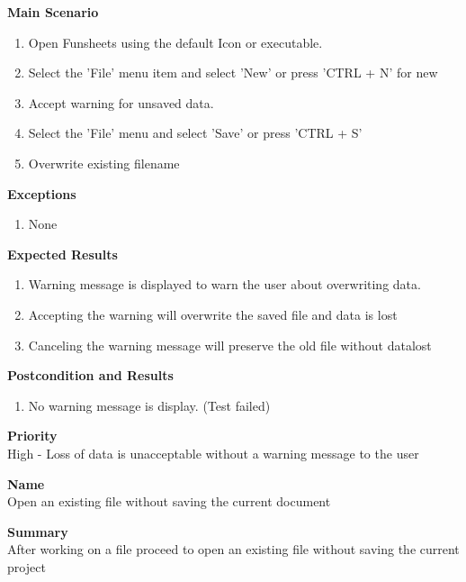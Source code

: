 \documentclass[12pt]{article}
\begin{document}
\noindent
{\bf Main Scenario}\\
\vspace*{-0.2in}
\begin{enumerate}
\item Open Funsheets using the default Icon or executable.
\item Select the 'File' menu item and select 'New' or press 'CTRL + N' for new
\item Accept warning for unsaved data.
\item Select the 'File' menu and select 'Save' or press 'CTRL + S'
\item Overwrite existing filename
\end{enumerate}

{\bf Exceptions}\
\begin{enumerate}
\item None
\end{enumerate}

{\bf Expected Results}\
\begin{enumerate}
\item Warning message is displayed to warn the user about overwriting data.
\item Accepting the warning will overwrite the saved file and data is lost
\item Canceling the warning message will preserve the old file without datalost
\end{enumerate}

\noindent
{\bf Postcondition and Results}\
\begin{enumerate}
\item No warning message is display. (Test failed)
\end{enumerate}

\noindent
{\bf Priority}\\
High - Loss of data is unacceptable without a warning message to the user
\noindent

\clearpage


\noindent
{\bf Name}\\
Open an existing file without saving the current document

\noindent
{\bf Summary}\\
After working on a file proceed to open an existing file without saving the current project
\end{document}
